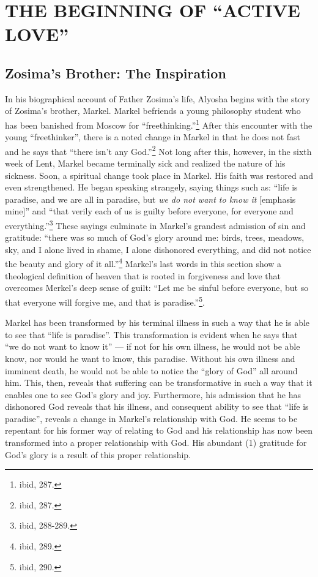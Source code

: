 \chapter{THE BEGINNING OF ``ACTIVE LOVE''}
\section{Zosima's Brother: The Inspiration}
In his biographical account of Father Zosima's life, Alyosha begins with the story of Zosima's brother, Markel. Markel befriends a young philosophy student who has been banished from Moscow for ``freethinking.''\footnote{ibid, 287.} After this encounter with the young ``freethinker'', there is a noted change in Markel in that he does not fast and he says that ``there isn't any God.''\footnote{ibid, 287.} Not long after this, however, in the sixth week of Lent, Markel became terminally sick and realized the nature of his sickness. Soon, a spiritual change took place in Markel. His faith was restored and even strengthened. He began speaking strangely, saying things such as: ``life is paradise, and we are all in paradise, but \emph{we do not want to know it} [emphasis mine]'' and ``that verily each of us is guilty before everyone, for everyone and everything.''\footnote{ibid, 288-289.} These sayings culminate in Markel's grandest admission of sin and gratitude: ``there was so much of God's glory around me: birds, trees, meadows, sky, and I alone lived in shame, I alone dishonored everything, and did not notice the beauty and glory of it all.''\footnote{ibid, 289.} Markel's last words in this section show a theological definition of heaven that is rooted in forgiveness and love that overcomes Merkel's deep sense of guilt: ``Let me be sinful before everyone, but so that everyone will forgive me, and that is paradise.''\footnote{ibid, 290.}.

Markel has been transformed by his terminal illness in such a way that he is able to see that ``life is paradise''. This transformation is evident when he says that ``we do not want to know it'' --- if not for his own illness, he would not be able know, nor would he want to know, this paradise. Without his own illness and imminent death, he would not be able to notice the ``glory of God'' all around him. This, then, reveals that suffering can be transformative in such a way that it enables one to see God's glory and joy. Furthermore, his admission that he has dishonored God reveals that his illness, and consequent ability to see that ``life is paradise'', reveals a change in Markel's relationship with God. He seems to be repentant for his former way of relating to God and his relationship has now been transformed into a proper relationship with God. His abundant (1) gratitude for God's glory is a result of this proper relationship.

